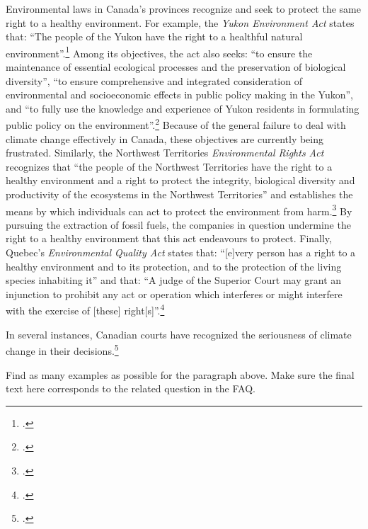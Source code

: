 Environmental laws in Canada's provinces recognize and seek to protect the same right to a healthy environment.  
For example, the \emph{Yukon Environment Act} states that: ``The people of the Yukon have the right to a healthful natural environment''.\footcite[][p. 14]{YukonEnvAct}
Among its objectives, the act also seeks: ``to ensure the maintenance of essential ecological processes and the preservation of biological diversity'', ``to ensure comprehensive and integrated consideration of environmental and socioeconomic effects in public policy making in the Yukon'', and ``to fully use the knowledge and experience of Yukon residents in formulating public policy on the environment''.\footcite[][p. 13]{YukonEnvAct}
Because of the general failure to deal with climate change effectively in Canada, these objectives are currently being frustrated.
Similarly, the Northwest Territories \emph{Environmental Rights Act} recognizes that ``the people of the Northwest Territories have the right to a healthy environment and a right to protect the integrity, biological diversity and productivity of the ecosystems in the Northwest Territories'' and establishes the means by which individuals can act to protect the environment from harm.\footcite[][]{NWTEnvRightsAct}
By pursuing the extraction of fossil fuels, the companies in question undermine the right to a healthy environment that this act endeavours to protect. 
Finally, Quebec's \emph{Environmental Quality Act} states that: ``[e]very person has a right to a healthy environment and to its protection, and to the protection of the living species inhabiting it'' and that: ``A judge of the Superior Court may grant an injunction to prohibit any act or operation which interferes or might interfere with the exercise of [these] right[s]''.\footcite[][]{QuebecEQA}



In several instances, Canadian courts have recognized the seriousness of climate change in their decisions.\footcite[For a summary of the history of judicial interpretation of the powers of the federal and provincial governments concerning environmental protection, see Chapter 3 of: ][]{Harrison1996}

\begin{vcom}
Find as many examples as possible for the paragraph above. Make sure the final text here corresponds to the related question in the FAQ.
\end{vcom}


